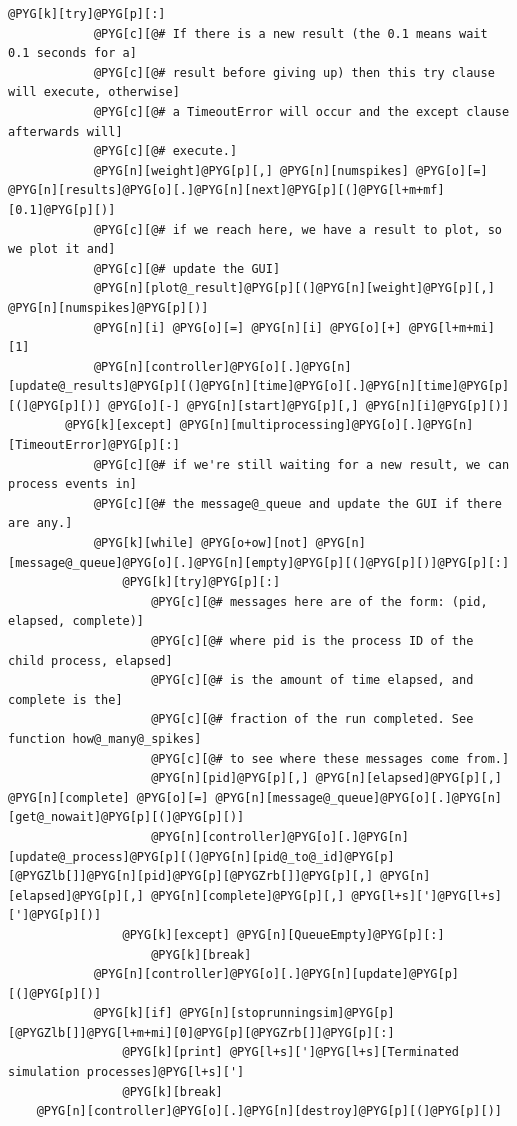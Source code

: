 \documentclass[letterpaper,10pt,english]{manual}
\begin{document}
\begin{Verbatim}[commandchars=@\[\]]
        @PYG[k][try]@PYG[p][:]
            @PYG[c][@# If there is a new result (the 0.1 means wait 0.1 seconds for a]
            @PYG[c][@# result before giving up) then this try clause will execute, otherwise]
            @PYG[c][@# a TimeoutError will occur and the except clause afterwards will]
            @PYG[c][@# execute.]
            @PYG[n][weight]@PYG[p][,] @PYG[n][numspikes] @PYG[o][=] @PYG[n][results]@PYG[o][.]@PYG[n][next]@PYG[p][(]@PYG[l+m+mf][0.1]@PYG[p][)]
            @PYG[c][@# if we reach here, we have a result to plot, so we plot it and]
            @PYG[c][@# update the GUI]
            @PYG[n][plot@_result]@PYG[p][(]@PYG[n][weight]@PYG[p][,] @PYG[n][numspikes]@PYG[p][)]
            @PYG[n][i] @PYG[o][=] @PYG[n][i] @PYG[o][+] @PYG[l+m+mi][1]
            @PYG[n][controller]@PYG[o][.]@PYG[n][update@_results]@PYG[p][(]@PYG[n][time]@PYG[o][.]@PYG[n][time]@PYG[p][(]@PYG[p][)] @PYG[o][-] @PYG[n][start]@PYG[p][,] @PYG[n][i]@PYG[p][)]
        @PYG[k][except] @PYG[n][multiprocessing]@PYG[o][.]@PYG[n][TimeoutError]@PYG[p][:]
            @PYG[c][@# if we're still waiting for a new result, we can process events in]
            @PYG[c][@# the message@_queue and update the GUI if there are any.]
            @PYG[k][while] @PYG[o+ow][not] @PYG[n][message@_queue]@PYG[o][.]@PYG[n][empty]@PYG[p][(]@PYG[p][)]@PYG[p][:]
                @PYG[k][try]@PYG[p][:]
                    @PYG[c][@# messages here are of the form: (pid, elapsed, complete)]
                    @PYG[c][@# where pid is the process ID of the child process, elapsed]
                    @PYG[c][@# is the amount of time elapsed, and complete is the]
                    @PYG[c][@# fraction of the run completed. See function how@_many@_spikes]
                    @PYG[c][@# to see where these messages come from.]
                    @PYG[n][pid]@PYG[p][,] @PYG[n][elapsed]@PYG[p][,] @PYG[n][complete] @PYG[o][=] @PYG[n][message@_queue]@PYG[o][.]@PYG[n][get@_nowait]@PYG[p][(]@PYG[p][)]
                    @PYG[n][controller]@PYG[o][.]@PYG[n][update@_process]@PYG[p][(]@PYG[n][pid@_to@_id]@PYG[p][@PYGZlb[]]@PYG[n][pid]@PYG[p][@PYGZrb[]]@PYG[p][,] @PYG[n][elapsed]@PYG[p][,] @PYG[n][complete]@PYG[p][,] @PYG[l+s][']@PYG[l+s][']@PYG[p][)]
                @PYG[k][except] @PYG[n][QueueEmpty]@PYG[p][:]
                    @PYG[k][break]
            @PYG[n][controller]@PYG[o][.]@PYG[n][update]@PYG[p][(]@PYG[p][)]
            @PYG[k][if] @PYG[n][stoprunningsim]@PYG[p][@PYGZlb[]]@PYG[l+m+mi][0]@PYG[p][@PYGZrb[]]@PYG[p][:]
                @PYG[k][print] @PYG[l+s][']@PYG[l+s][Terminated simulation processes]@PYG[l+s][']
                @PYG[k][break]
    @PYG[n][controller]@PYG[o][.]@PYG[n][destroy]@PYG[p][(]@PYG[p][)]


\end{Verbatim}
\end{document}
